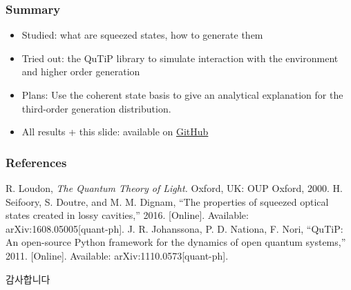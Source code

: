 \documentclass{beamer}
\begin{document}
\begin{frame}[c]
  \frametitle{Summary}
  \begin{itemize}
     \item Studied: what are squeezed states, how to generate them
     \item Tried out: the QuTiP library to simulate interaction with the environment and higher order generation
     \item Plans: Use the coherent state basis to give an analytical explanation for the third-order generation distribution.
     \item All results + this slide: available on \href{https://github.com/LimitEpsilon/quantum_sim}{GitHub}
  \end{itemize}
\end{frame}

\begin{frame}[c]
\frametitle{References}
\footnotesize{
\begin{thebibliography}{99} %
 R. Loudon, \textit{The Quantum Theory of Light.} Oxford, UK: OUP Oxford, 2000.
 H. Seifoory, S. Doutre, and M. M. Dignam, ``The properties of squeezed optical states created in lossy cavities,'' 2016. [Online]. Available: arXiv:1608.05005[quant-ph].
 J. R. Johanssona, P. D. Nationa, F. Nori, ``QuTiP: An open-source Python framework for the dynamics of open quantum
systems,'' 2011. [Online]. Available: arXiv:1110.0573[quant-ph].
\end{thebibliography}
}
\end{frame}

\begin{frame}[c]
  \centering\LARGE
  감사합니다\\[\baselineskip]
\end{frame}
\end{document}
